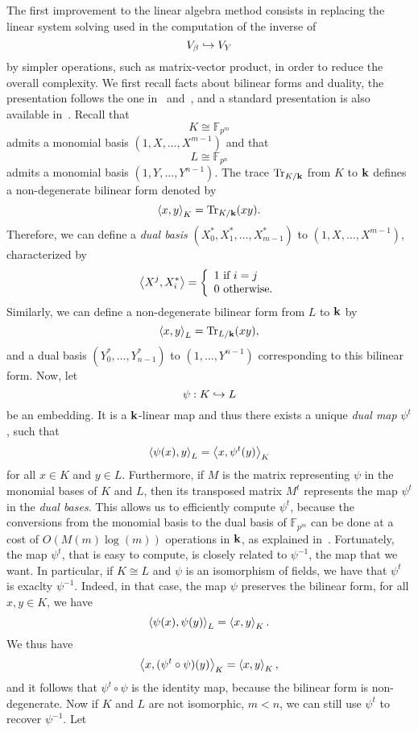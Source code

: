 The first improvement to the linear algebra method consists in replacing the
linear system solving used in the computation of the inverse of
\[
  V_\beta\hookrightarrow V_Y
\]
by simpler operations, such as matrix-vector product, in order to reduce the
overall complexity. We first recall facts about bilinear forms and duality, the
presentation follows the one in~\cite{BDDFS17} and~\cite{DDS14}, and a standard
presentation is also available in~\cite{Lang04}. Recall that
\[
  K\cong\mathbb{F}_{p^m}
\]
admits a monomial basis $(1, X, \dots, X^{m-1})$ and that
\[
  L\cong\mathbb{F}_{p^n}
\]
admits a monomial basis $(1, Y, \dots, Y^{n-1})$. The trace $\operatorname{Tr}_{K/\mathbf{k}}$ from $K$ to
$\mathbf{k}$ defines a non-degenerate bilinear form denoted by
\[
  \left\langle x,y\right\rangle_K = \operatorname{Tr}_{K/\mathbf{k}}(xy).
\]
Therefore, we can define a \emph{dual basis} $(X_0^*, X_1^*, \dots, X_{m-1}^*)$
to $(1, X, \dots, X^{m-1})$, characterized by
\[
  \left\langle X^j,X_i^*\right\rangle=\left\{\begin{array}{l}
    1\text{ if }i=j\\
    0\text{ otherwise.}
  \end{array}\right.
\]
Similarly, we can define a non-degenerate bilinear form from $L$ to $\mathbf{k}$ by
\[
  \left\langle x,y\right\rangle_L = \operatorname{Tr}_{L/\mathbf{k}}(xy),
\]
and a dual basis $(Y_0^*, \dots, Y_{n-1}^*)$ to $(1, \dots, Y^{n-1})$
corresponding to this bilinear form. Now, let
\[
  \psi:K\hookrightarrow L
\]
be an embedding. It is a $\mathbf{k}$-linear map and thus there exists a unique
\emph{dual map} $\psi^t$, such that
\[
  \left\langle\psi(x),y\right\rangle_L = \left\langle x,\psi^t(y)\right\rangle_K
\]
for all $x\in K$ and $y\in L$. Furthermore, if $M$ is the matrix representing
$\psi$ in the monomial bases of $K$ and $L$, then its transposed matrix $M^t$
represents the map $\psi^t$ in the \emph{dual bases}. This allows us to
efficiently compute $\psi^t$, because the conversions from the monomial basis to
the dual basis of
$\mathbb{F}_{p^m}$ can be done at a cost of $O(M(m)\log(m))$ operations in $\mathbf{k}$,
as explained in~\cite{DDS14}. Fortunately, the map $\psi^t$, that is easy to
compute, is closely related to $\psi^{-1}$, the map that we want. In particular, if
$K\cong L$ and $\psi$ is an isomorphism of fields, we have that $\psi^t$ is
exaclty $\psi^{-1}$. Indeed, in that case, the map $\psi$ preserves the bilinear
form, \ie for all $x, y\in K$, we have
\[
  \left\langle\psi(x),\psi(y)\right\rangle_L = \left\langle x,y\right\rangle_K.
\]
We thus have
\[
  \left\langle x,(\psi^t\circ\psi)(y)\right\rangle_K = \left\langle x,y\right\rangle_K,
\]
and it follows that $\psi^t\circ\psi$ is the identity map, because the bilinear
form is non-degenerate. Now if $K$ and $L$ are not isomorphic, \ie $m<n$, we can
still use $\psi^t$ to recover $\psi^{-1}$. Let 
